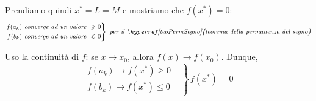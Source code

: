 \documentclass[../../analisi1]{subfiles}
\begin{document}
            Prendiamo quindi \(x^* = L = M\) e mostriamo che \(f(x^*) = 0\):
            \[
                \left.
                \begin{aligned}
                    f(a_k) \text{\emph{ converge ad un valore }} \geqslant 0\\
                    f(b_k) \text{\emph{ converge ad un valore }} \leqslant 0
                \end{aligned}
                \right\}
                \text{\emph{ per il \hyperref[teoPermSegno]{teorema della permanenza del segno}}}
            \]

            Uso la continuità di \(f\): se \(x \to x_0\), allora \(f(x) \to f(x_0)\). Dunque,
            \[
                \left.
                \begin{aligned}
                    f(a_k) \to f(x^*) \geqslant 0&\\
                    f(b_k) \to f(x^*) \leqslant 0&
                \end{aligned}
                \right\} \, f(x^*) = 0
            \]
        
\end{document}
